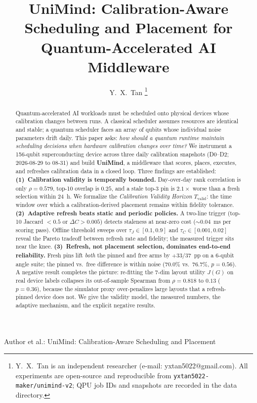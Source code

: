 \documentclass[journal,10pt,twocolumn]{IEEEtran}
\begin{document}
\title{UniMind: Calibration-Aware Scheduling and Placement for Quantum-Accelerated AI Middleware}

\author{Y.~X.~Tan%
\thanks{Y.~X.~Tan is an independent researcher (e-mail: yxtan5022@gmail.com). All experiments are open-source and
reproducible from \texttt{yxtan5022-maker/unimind-v2}; QPU job IDs and snapshots are recorded in the data directory.}}

%
{Author \MakeLowercase{et al.}: UniMind: Calibration-Aware Scheduling and Placement}

\maketitle

\begin{abstract}
Quantum-accelerated AI workloads must be scheduled onto physical devices whose calibration changes
between runs. A classical scheduler assumes resources are identical and stable; a quantum scheduler
faces an array of qubits whose individual noise parameters drift daily. This paper asks:
\emph{how should a quantum runtime maintain scheduling decisions when hardware calibration changes
over time?} We instrument a 156-qubit superconducting device across three daily calibration
snapshots (D0--D2; 2026-08-29 to 08-31) and build \textbf{UniMind}, a middleware that scores,
places, executes, and refreshes calibration data in a closed loop. Three findings are established:
\textbf{(1)~Calibration validity is temporally bounded.} Day-over-day rank correlation is only
$\rho{=}0.579$, top-10 overlap is $0.25$, and a stale top-3 pin is $2.1\times$ worse than a fresh
selection within 24~h. We formalize the \emph{Calibration Validity Horizon}
$T_{\mathrm{valid}}$: the time window over which a calibration-derived placement remains within
fidelity tolerance. \textbf{(2)~Adaptive refresh beats static and periodic policies.} A two-line
trigger (top-10 Jaccard $<0.5$ or $\Delta C{>}0.005$) detects staleness at near-zero cost
($\sim0.04$~ms per scoring pass). Offline threshold sweeps over $\tau_J{\in}[0.1,0.9]$ and
$\tau_C{\in}[0.001,0.02]$ reveal the Pareto tradeoff between refresh rate and fidelity;
the measured trigger sits near the knee. \textbf{(3)~Refresh, not placement selection, dominates
end-to-end reliability.} Fresh pins lift \emph{both} the pinned and free arms by $+33/37$~pp on a
6-qubit angle suite; the pinned vs.\ free difference is within noise ($70.0\%$ vs.\ $76.7\%$,
$p{=}0.56$). A negative result completes the picture: re-fitting the 7-dim layout utility $J(G)$
on real device labels collapses its out-of-sample Spearman from $\rho{=}0.818$ to $0.13$
($p{=}0.36$), because the simulator proxy over-penalizes large layouts that a refresh-pinned
device does not. We give the validity model, the measured numbers, the adaptive mechanism, and
the explicit negative results.
\end{abstract}
\end{document}
